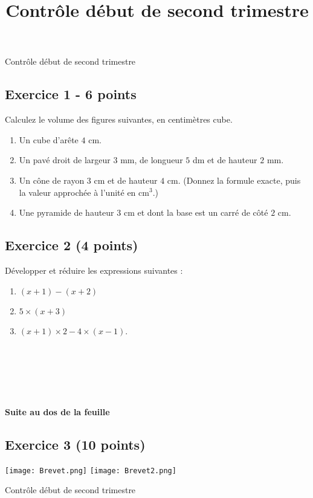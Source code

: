 \documentclass[14 pt]{extarticle}
\title{Contrôle début de second trimestre}
\date{}
\theoremstyle{plain}
\begin{document}
	{\begin{center}{\Large{Contrôle début de second trimestre}}\end{center}}
\subsection*{Exercice 1 - 6 points}	%
Calculez le volume des figures suivantes, en centimètres cube. \begin{enumerate}
\item Un cube d'arête $4$ cm. 
\item Un pavé droit de largeur $3$ mm, de longueur $5$ dm et de hauteur $2$ mm. 
\item Un cône de rayon $3$ cm et de hauteur $4$ cm. (Donnez la formule exacte, puis la valeur approchée à l'unité en $\mathrm{cm}^3$.)
\item Une pyramide de hauteur $3$ cm et dont la base est un carré de côté $2$ cm. 

\end{enumerate}

\subsection*{Exercice 2 (4 points)} %
 Développer et réduire les expressions suivantes :\begin{enumerate}
 \item $ (x+1) - (x+2)$
 \item $5 \times (x+3) $
 \item $(x+1) \times 2 - 4\times (x-1)$. 
\end{enumerate}    

\ \ \ 


\ \ \ 


\ \ \ 

\textbf{Suite au dos de la feuille}
  
  
  \subsection*{Exercice 3 (10 points)}

\texttt{[image: Brevet.png]} 
\texttt{[image: Brevet2.png]} 
 
 \newpage
 
	{\begin{center}{\Large{Contrôle début de second trimestre}}\end{center}}
	
\end{document}
